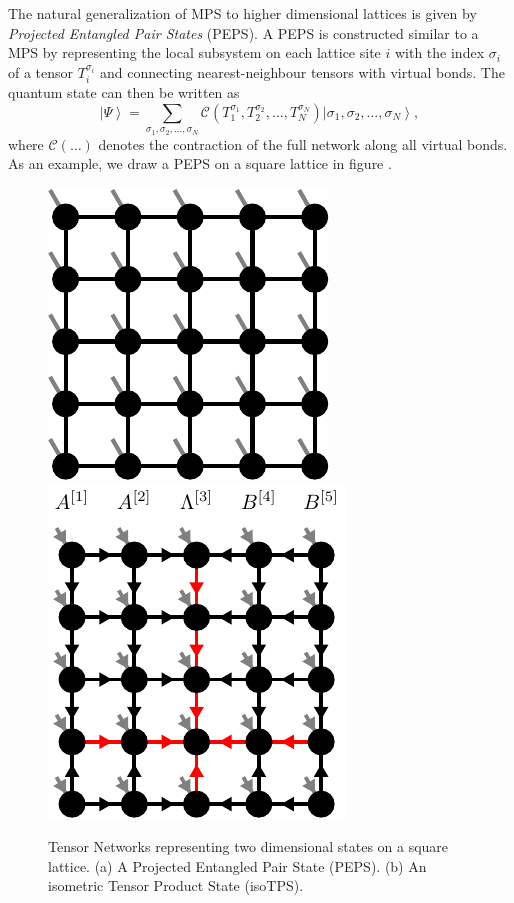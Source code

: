 The natural generalization of MPS to higher dimensional lattices is given by \textit{Projected Entangled Pair States} (PEPS). A PEPS is constructed similar to a MPS by representing the local subsystem on each lattice site $i$ with the index $\sigma_i$ of a tensor $T_i^{\sigma_i}$ and connecting nearest-neighbour tensors with virtual bonds. The quantum state can then be written as
\begin{equation}
	\label{eq:PEPS_definition_general}
	\left|\Psi\right\rangle = \sum_{\sigma_1,\sigma_2,\dots,\sigma_N} \mathcal{C}\left(T_1^{\sigma_1}, T_2^{\sigma_2}, \dots, T_N^{\sigma_N}\right) \left|\sigma_1,\sigma_2,\dots,\sigma_N\right\rangle,
\end{equation}
where $\mathcal{C}(\dots)$ denotes the contraction of the full network along all virtual bonds. As an example, we draw a PEPS on a square lattice in figure . \par
\begin{figure}
	\centering
	\subcaptionbox{\label{fig:square_PEPS}}
	{%
		\includegraphics[scale=1]{figures/tikz/Tensor_Networks/isoTPS_structure/isoTPS_structure_a.pdf}
	}
	\quad\quad
	\subcaptionbox{\label{fig:square_isoTPS}}
	{%
		\includegraphics[scale=1]{figures/tikz/Tensor_Networks/isoTPS_structure/isoTPS_structure_b.pdf}
	}
	\caption{Tensor Networks representing two dimensional states on a square lattice. (a) A Projected Entangled Pair State (PEPS). (b) An isometric Tensor Product State (isoTPS). }
	\label{fig:square_PEPS_and_isoTPS}
\end{figure}
